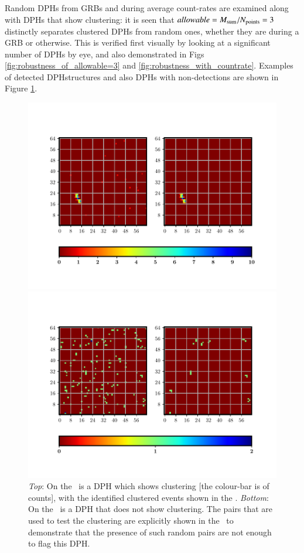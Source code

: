 Random DPHs from GRBs and during average count-rates are examined along with DPHs that show clustering: it is seen that $allowable = M_{\rm{sum}} / N_{\rm{points}} = 3$ distinctly separates clustered DPHs from random ones, whether they are during a GRB or otherwise. This is verified first visually by looking at a significant number of DPHs by eye, and also demonstrated in Figs \ref{fig:robustness_of_allowable=3} and \ref{fig:robustness_with_countrate}. Examples of detected DPHstructures and also DPHs with non-detections are shown in Figure \ref{fig:DPHs_flagged_and_unflagged}.




\begin{figure}
\begin{center}
\includegraphics[scale=0.8]{Q0--peak_6262}
\end{center}
\begin{center}
\includegraphics[scale=0.8]{Q0--peak_10009}
\end{center}
\caption[Examples of DPHs that are flagged, and those that are not]{\emph{Top}: On the \eL\ is a DPH which shows clustering [the colour-bar is of counts], with the identified clustered events shown in the \eR. \emph{Bottom}: On the \eL\ is a DPH that does not show clustering. The pairs that are used to test the clustering are explicitly shown in the \eR\ to demonstrate that the presence of such random pairs are not enough to flag this DPH.
\label{fig:DPHs_flagged_and_unflagged}}
\end{figure}
